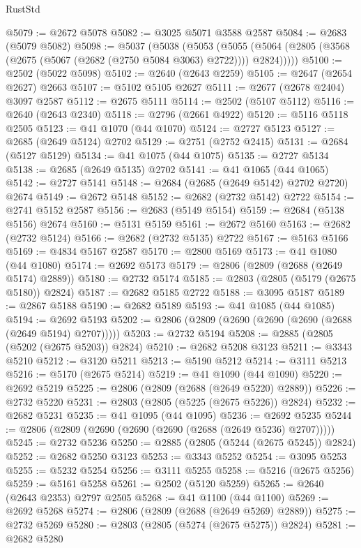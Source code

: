\begin{lexlean}{RustStd}
\begin{coremodule}
@5079 := @2672 @5078
@5082 := @3025 @5071 @3588 @2587
@5084 := @2683 (@5079 @5082)
@5098 := @5037
    (@5038
      (@5053
        (@5055 (@5064 (@2805 (@3568 (@2675 (@5067 (@2682 (@2750 @5084 @3063) @2722)))) @2824)))))
@5100 := @2502 (@5022 @5098)
@5102 := @2640 (@2643 @2259)
@5105 := @2647 (@2654 @2627) @2663
@5107 := @5102 @5105 @2627
@5111 := @2677 (@2678 @2404) @3097 @2587
@5112 := @2675 @5111
@5114 := @2502 (@5107 @5112)
@5116 := @2640 (@2643 @2340)
@5118 := @2796 (@2661 @4922)
@5120 := @5116 @5118 @2505
@5123 := @41 @1070 (@44 @1070)
@5124 := @2727 @5123
@5127 := @2685 (@2649 @5124) @2702
@5129 := @2751 (@2752 @2415)
@5131 := @2684 (@5127 @5129)
@5134 := @41 @1075 (@44 @1075)
@5135 := @2727 @5134
@5138 := @2685 (@2649 @5135) @2702
@5141 := @41 @1065 (@44 @1065)
@5142 := @2727 @5141
@5148 := @2684 (@2685 (@2649 @5142) @2702 @2720) @2674
@5149 := @2672 @5148
@5152 := @2682 (@2732 @5142) @2722
@5154 := @2741 @5152 @2587
@5156 := @2683 (@5149 @5154)
@5159 := @2684 (@5138 @5156) @2674
@5160 := @5131 @5159
@5161 := @2672 @5160
@5163 := @2682 (@2732 @5124)
@5166 := @2682 (@2732 @5135) @2722
@5167 := @5163 @5166
@5169 := @4834 @5167 @2587
@5170 := @2800 @5169
@5173 := @41 @1080 (@44 @1080)
@5174 := @2692 @5173
@5179 := @2806 (@2809 (@2688 (@2649 @5174) @2889))
@5180 := @2732 @5174
@5185 := @2803 (@2805 (@5179 (@2675 @5180)) @2824)
@5187 := @2682 @5185 @2722
@5188 := @3095 @5187
@5189 := @2867 @5188
@5190 := @2682 @5189
@5193 := @41 @1085 (@44 @1085)
@5194 := @2692 @5193
@5202 := @2806 (@2809 (@2690 (@2690 (@2690 (@2688 (@2649 @5194) @2707)))))
@5203 := @2732 @5194
@5208 := @2885 (@2805 (@5202 (@2675 @5203)) @2824)
@5210 := @2682 @5208 @3123
@5211 := @3343 @5210
@5212 := @3120 @5211
@5213 := @5190 @5212
@5214 := @3111 @5213
@5216 := @5170 (@2675 @5214)
@5219 := @41 @1090 (@44 @1090)
@5220 := @2692 @5219
@5225 := @2806 (@2809 (@2688 (@2649 @5220) @2889))
@5226 := @2732 @5220
@5231 := @2803 (@2805 (@5225 (@2675 @5226)) @2824)
@5232 := @2682 @5231
@5235 := @41 @1095 (@44 @1095)
@5236 := @2692 @5235
@5244 := @2806 (@2809 (@2690 (@2690 (@2690 (@2688 (@2649 @5236) @2707)))))
@5245 := @2732 @5236
@5250 := @2885 (@2805 (@5244 (@2675 @5245)) @2824)
@5252 := @2682 @5250 @3123
@5253 := @3343 @5252
@5254 := @3095 @5253
@5255 := @5232 @5254
@5256 := @3111 @5255
@5258 := @5216 (@2675 @5256)
@5259 := @5161 @5258
@5261 := @2502 (@5120 @5259)
@5265 := @2640 (@2643 @2353) @2797 @2505
@5268 := @41 @1100 (@44 @1100)
@5269 := @2692 @5268
@5274 := @2806 (@2809 (@2688 (@2649 @5269) @2889))
@5275 := @2732 @5269
@5280 := @2803 (@2805 (@5274 (@2675 @5275)) @2824)
@5281 := @2682 @5280

\end{coremodule}
\end{lexlean}
